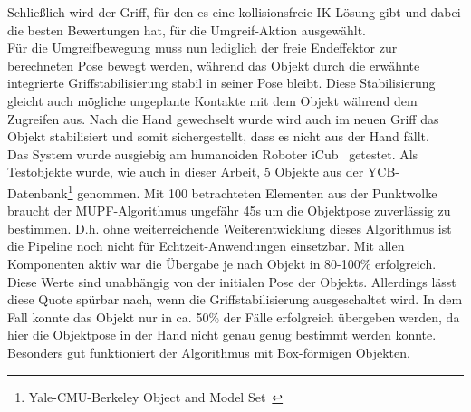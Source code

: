 Schließlich wird der Griff, für den es eine kollisionsfreie IK-Lösung gibt und dabei die besten Bewertungen hat, für die Umgreif-Aktion ausgewählt. \\
Für die Umgreifbewegung muss nun lediglich der freie Endeffektor zur berechneten Pose bewegt werden, während das Objekt durch die erwähnte integrierte Griffstabilisierung stabil in seiner Pose bleibt. Diese Stabilisierung gleicht auch mögliche ungeplante Kontakte mit dem Objekt während dem Zugreifen aus. Nach die Hand gewechselt wurde wird auch im neuen Griff das Objekt stabilisiert und somit sichergestellt, dass es nicht aus der Hand fällt.
\\

Das System wurde ausgiebig am humanoiden Roboter iCub~\cite{metta2010icub} getestet. Als Testobjekte wurde, wie auch in dieser Arbeit, 5 Objekte aus der YCB-Datenbank\footnote{\glqq Yale-CMU-Berkeley Object and Model Set\grqq{}~\citep{calli2015ycb}} genommen. Mit 100 betrachteten Elementen aus der Punktwolke braucht der MUPF-Algorithmus ungefähr 45s um die Objektpose zuverlässig zu bestimmen. D.h. ohne weiterreichende Weiterentwicklung dieses Algorithmus ist die Pipeline noch nicht für Echtzeit-Anwendungen einsetzbar. Mit allen Komponenten aktiv war die Übergabe je nach Objekt in 80-100\% erfolgreich. Diese Werte sind unabhängig von der initialen Pose der Objekts. Allerdings lässt diese Quote spürbar nach, wenn die Griffstabilisierung ausgeschaltet wird. In dem Fall konnte das Objekt nur in ca. 50\% der Fälle erfolgreich übergeben werden, da hier die Objektpose in der Hand nicht genau genug bestimmt werden konnte. Besonders gut funktioniert der Algorithmus mit Box-förmigen Objekten.